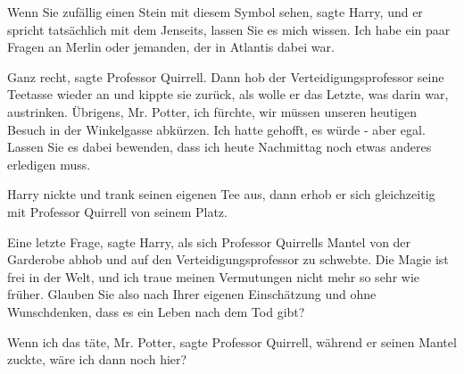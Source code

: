 \glqq{}Wenn Sie zufällig einen Stein mit diesem Symbol sehen\grqq{}, sagte Harry,
\glqq{}und er spricht tatsächlich mit dem Jenseits, lassen Sie es mich wissen.
Ich habe ein paar Fragen an Merlin oder jemanden, der in Atlantis dabei war.\grqq{}

\glqq{}Ganz recht\grqq{}, sagte Professor Quirrell. Dann hob der
Verteidigungsprofessor seine Teetasse wieder an und kippte sie zurück, als wolle
er das Letzte, was darin war, austrinken. \glqq{}Übrigens, Mr. Potter, ich
fürchte, wir müssen unseren heutigen Besuch in der Winkelgasse abkürzen. Ich
hatte gehofft, es würde - aber egal. Lassen Sie es dabei bewenden, dass ich
heute Nachmittag noch etwas anderes erledigen muss.\grqq{}

Harry nickte und trank seinen eigenen Tee aus, dann erhob er sich gleichzeitig
mit Professor Quirrell von seinem Platz.

\glqq{}Eine letzte Frage\grqq{}, sagte Harry, als sich Professor Quirrells Mantel
von der Garderobe abhob und auf den Verteidigungsprofessor zu schwebte. \glqq{}
Die Magie ist frei in der Welt, und ich traue meinen Vermutungen nicht mehr so
sehr wie früher. Glauben Sie also nach Ihrer eigenen Einschätzung und ohne
Wunschdenken, dass es ein Leben nach dem Tod gibt?\grqq{}

\glqq{}Wenn ich das täte, Mr. Potter\grqq{}, sagte Professor Quirrell, während er
seinen Mantel zuckte, \glqq{}wäre ich dann noch hier?\grqq{}

